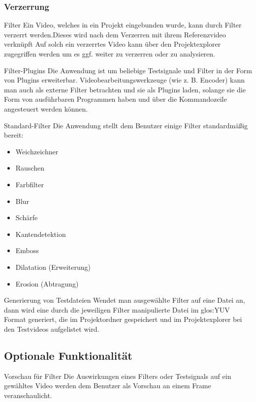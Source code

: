 \subsubsection{Verzerrung}
 Filter
\newline
Ein Video, welches in ein Projekt eingebunden wurde, kann durch Filter verzerrt werden.Dieses wird
nach dem Verzerren mit ihrem Referenzvideo verknüpft  Auf solch ein verzerrtes Video kann über den Projektexplorer zugegriffen werden um es ggf. weiter zu verzerren oder zu analysieren.


 Filter-Plugins
\newline
Die Anwendung ist um beliebige Testsignale und Filter in der Form von Plugins erweiterbar.
 Videobearbeitungswerkzeuge (wie z. B. Encoder) kann man auch als externe Filter betrachten und sie als
  Plugins laden, solange sie die Form von ausführbaren Programmen haben und über die Kommandozeile 
angesteuert werden können.

 Standard-Filter
\newline
Die Anwendung stellt dem Benutzer einige Filter standardmäßig bereit:
\begin{itemize}
\item Weichzeichner
\item Rauschen
\item Farbfilter
\item Blur
\item Schärfe
\item Kantendetektion
\item Emboss
\item Dilatation (Erweiterung)
\item Erosion (Abtragung)

\end{itemize}

 Generierung von Testdateien
\newline
Wendet man ausgewählte Filter auf eine Datei an, dann wird eine durch die jeweiligen Filter manipulierte Datei im \gls{glos:YUV} Format generiert, die im Projektordner gespeichert und im Projektexplorer bei den Testvideos aufgelistet wird.





\subsection{Optionale Funktionalität}

 Vorschau für Filter
\newline
Die Auswirkungen eines Filters oder Testsignals auf ein gewähltes Video werden dem Benutzer als Vorschau an einem Frame veranschaulicht.


